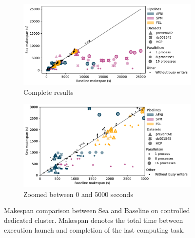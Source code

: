 \documentclass[fleqn,10pt]{wlscirep}
\begin{document}
\begin{figure}

\begin{subfigure}{0.5\textwidth}
    \centering
    \captionsetup{width=.85\linewidth}
    \includegraphics[width=\columnwidth]{figures/slashbin_nozoom.pdf}%
    \caption{Complete results}\label{fig:seaneuro:slashbinfull}
\end{subfigure}
\begin{subfigure}{0.5\textwidth}
    \centering
    \captionsetup{width=.85\linewidth}
    \includegraphics[width=\linewidth]{figures/slashbin_withzoom.pdf}
    \caption{Zoomed between 0 and 5000 seconds}\label{fig:seaneuro:slashbinzoom}
\end{subfigure}
\caption{Makespan comparison between Sea and Baseline on controlled dedicated cluster. Makespan
denotes the total time between execution launch and completion of the last computing task.}
\label{fig:seaneuro:slashbin}
\end{figure}
\end{document}
